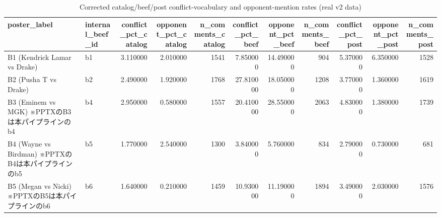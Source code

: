 \begin{table}
\caption{Corrected catalog/beef/post conflict-vocabulary and opponent-mention rates (real v2 data)}
\label{tab:corrected_poster_table}
\begin{tabular}{llrrrrrrrrr}
\toprule
poster\_label & internal\_beef\_id & conflict\_pct\_catalog & opponent\_pct\_catalog & n\_comments\_catalog & conflict\_pct\_beef & opponent\_pct\_beef & n\_comments\_beef & conflict\_pct\_post & opponent\_pct\_post & n\_comments\_post \\
\midrule
B1 (Kendrick Lamar vs Drake) & b1 & 3.110000 & 2.010000 & 1541 & 7.850000 & 14.490000 & 904 & 5.370000 & 6.350000 & 1528 \\
B2 (Pusha T vs Drake) & b2 & 2.490000 & 1.920000 & 1768 & 27.810000 & 18.050000 & 1208 & 3.770000 & 1.360000 & 1619 \\
B3 (Eminem vs MGK) ※PPTXのB3は本パイプラインのb4 & b4 & 2.950000 & 0.580000 & 1557 & 20.410000 & 28.550000 & 2063 & 4.830000 & 1.380000 & 1739 \\
B4 (Wayne vs Birdman) ※PPTXのB4は本パイプラインのb5 & b5 & 1.770000 & 2.540000 & 1300 & 3.840000 & 5.760000 & 834 & 2.790000 & 0.730000 & 681 \\
B5 (Megan vs Nicki) ※PPTXのB5は本パイプラインのb6 & b6 & 1.640000 & 0.210000 & 1459 & 10.930000 & 11.190000 & 1894 & 3.490000 & 2.030000 & 1576 \\
\bottomrule
\end{tabular}
\end{table}

